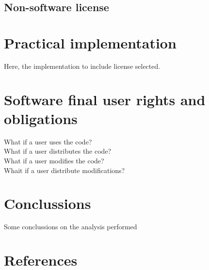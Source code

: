 \documentclass[11pt]{article}
\begin{document}
\subsection{Non-software license}

\section{Practical implementation}

Here, the implementation to include license selected.

\section{Software final user rights and obligations}

What if a user uses the code? \\
What if a user distributes the code? \\ 
What if a user modifies the code? \\
Whait if a user distribute modifications? \\

\section{Conclussions}

Some conclussions on the analysis performed \\

\section{References}
\end{document}
